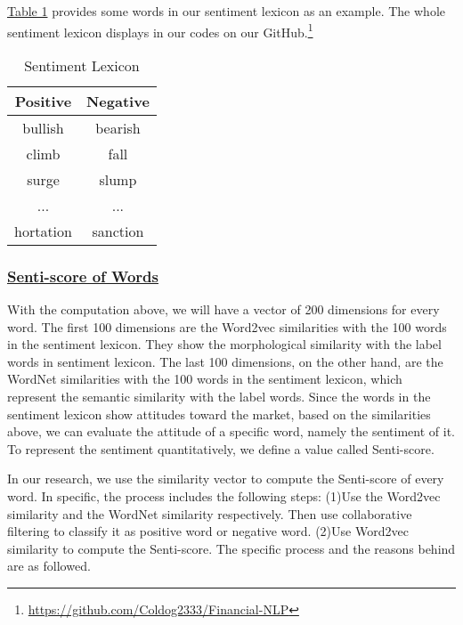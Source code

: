 \documentclass[10pt, conference, compsocconf]{IEEEtran}
\begin{document}
\hyperref[Table 1]{Table 1} provides some words in our sentiment lexicon as an example. The whole sentiment lexicon displays in our codes on our GitHub.\footnote{\href{https://github.com/Coldog2333/Financial-NLP}{https://github.com/Coldog2333/Financial-NLP}}
\begin{table}[!ht]
    \centering
    \begin{tabular}{c|c}
        \hline
        \textbf{Positive} & \textbf{Negative}\\
        \hline
        {bullish} & {bearish} \\
        {climb} & {fall} \\
        {surge} & {slump} \\
        {...} & {...} \\
        {hortation} & {sanction} \\
        \hline
    \end{tabular}
    \caption{Sentiment Lexicon}\label{Table 1}
\end{table}

\subsubsection{\underline{Senti-score of Words}}

With the computation above, we will have a vector of 200 dimensions for every word. The first 100 dimensions are the Word2vec similarities with the 100 words in the sentiment lexicon. They show the morphological similarity with the label words in sentiment lexicon. The last 100 dimensions, on the other hand, are the WordNet similarities with the 100 words in the sentiment lexicon, which represent the semantic similarity with the label words. Since the words in the sentiment lexicon show attitudes toward the market, based on the similarities above, we can evaluate the attitude of a specific word, namely the sentiment of it. To represent the sentiment quantitatively, we define a value called Senti-score.

In our research, we use the similarity vector to compute the Senti-score of every word. In specific, the process includes the following steps: (1)Use the Word2vec similarity and the WordNet similarity respectively. Then use collaborative filtering to classify it as positive word or negative word. (2)Use Word2vec similarity to compute the Senti-score. The specific process and the reasons behind are as followed.
\end{document}

